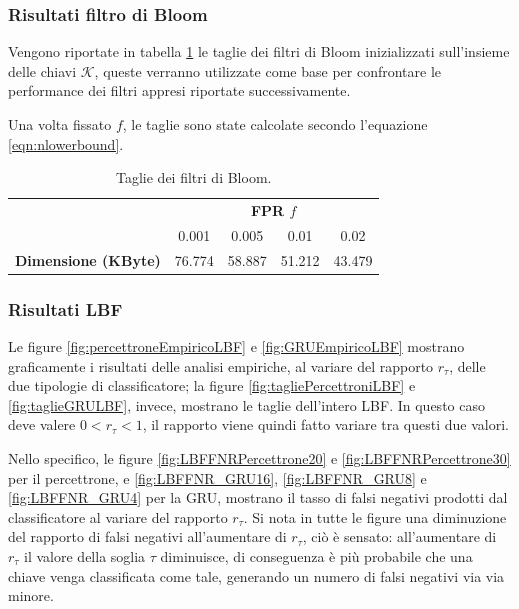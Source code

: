 \documentclass[../../main.tex]{subfiles}
\begin{document}
    \subsubsection{Risultati filtro di Bloom}

    Vengono riportate in tabella \ref{tab:taglieFiltro} le taglie dei filtri di Bloom inizializzati sull'insieme delle chiavi $\mathcal{K}$, queste verranno utilizzate come base per confrontare le performance dei filtri appresi riportate successivamente.

    Una volta fissato $f$, le taglie sono state calcolate secondo l'equazione \ref{eqn:nlowerbound}.
    
    \begin{table}[H]
        \centering
        \begin{tabular}{lcccc}
            \toprule
            {} & \multicolumn{4}{c}{\textbf{FPR $f$}}\\
            {} & 0.001 & 0.005 & 0.01 & 0.02\\
            \midrule
            \textbf{Dimensione (KByte)} & 76.774 & 58.887 & 51.212 & 43.479\\
            \bottomrule
        \end{tabular}
        \caption{Taglie dei filtri di Bloom.}
        \label{tab:taglieFiltro}
    \end{table}

    \subsubsection{Risultati LBF}
    Le figure \ref{fig:percettroneEmpiricoLBF} e \ref{fig:GRUEmpiricoLBF} mostrano graficamente i risultati delle analisi empiriche, al variare del rapporto $r_{\tau}$, delle due tipologie di classificatore; la figure \ref{fig:tagliePercettroniLBF} e \ref{fig:taglieGRULBF}, invece, mostrano le taglie dell'intero LBF. In questo caso deve valere $0 < r_{\tau} < 1$, il rapporto viene quindi fatto variare tra questi due valori.

    Nello specifico, le figure \ref{fig:LBFFNRPercettrone20} e \ref{fig:LBFFNRPercettrone30} per il percettrone, e \ref{fig:LBFFNR_GRU16}, \ref{fig:LBFFNR_GRU8} e \ref{fig:LBFFNR_GRU4} per la GRU, mostrano il tasso di falsi negativi prodotti dal classificatore al variare del rapporto $r_{\tau}$. Si nota in tutte le figure una diminuzione del rapporto di falsi negativi all'aumentare di $r_{\tau}$, ciò è sensato: all'aumentare di $r_{\tau}$ il valore della soglia $\tau$ diminuisce, di conseguenza è più probabile che una chiave venga classificata come tale, generando un numero di falsi negativi via via minore.
\end{document}
